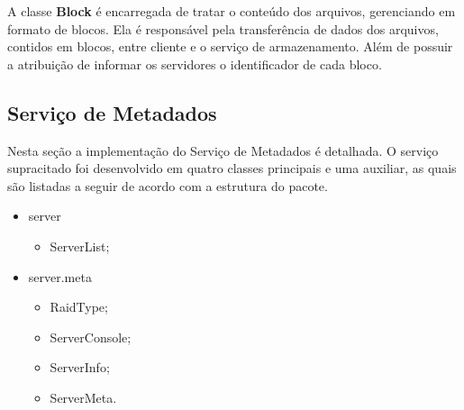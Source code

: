 A classe \textbf{Block} é encarregada de tratar o conteúdo dos arquivos, gerenciando em formato de blocos.
Ela é responsável pela transferência de dados dos arquivos, contidos em blocos, entre cliente e o serviço de armazenamento. Além de possuir a atribuição de informar os servidores o identificador de cada bloco.
\\





\subsection{Serviço de Metadados}
Nesta seção a implementação do Serviço de Metadados é detalhada. O serviço supracitado foi desenvolvido em quatro classes principais e uma auxiliar, as quais são listadas a seguir de acordo com  a estrutura do pacote.
\\

\begin{itemize}
	
	\item server
	\begin{itemize}
		\item ServerList;
	\end{itemize}
	\item server.meta
	\begin{itemize}
		\item RaidType;
		\item ServerConsole;
		\item ServerInfo;
		\item ServerMeta.
	\end{itemize}

\end{itemize}

